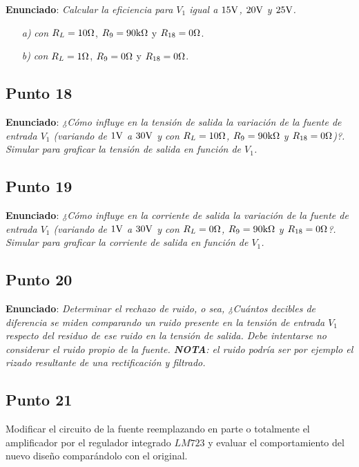 \textbf{Enunciado}: \textsl{Calcular la eficiencia para $V_{1}$ igual a $15 \si[per-mode=symbol]{\volt}$, $20 \si[per-mode=symbol]{\volt}$ y $25 \si[per-mode=symbol]{\volt}$.}

\begin{enumerate}
\item[\textsl{a)}] \textsl{con} $R_{L} = 10 \si[per-mode=symbol]{\ohm}$, $R_{9} = 90 \si[per-mode=symbol]{\kilo\ohm}$ y $R_{18} = 0 \si[per-mode=symbol]{\ohm}$.
\item[\textsl{b)}] \textsl{con} $R_{L} = 1 \si[per-mode=symbol]{\ohm}$, $R_{9} = 0 \si[per-mode=symbol]{\ohm}$ y $R_{18} = 0 \si[per-mode=symbol]{\ohm}$.
\end{enumerate}




\subsection{Punto 18}

\textbf{Enunciado}: \textsl{¿Cómo influye en la tensión de salida la variación de la fuente de entrada $V_{1}$ (variando de $1 \si[per-mode=symbol]{\volt}$ a $30 \si[per-mode=symbol]{\volt}$ y con $R_{L} = 10 \si[per-mode=symbol]{\ohm}$, $R_{9} = 90 \si[per-mode=symbol]{\kilo\ohm}$ y $R_{18} = 0 \si[per-mode=symbol]{\ohm}$)?. Simular para graficar la tensión de salida en función de $V_{1}$.}\\





\subsection{Punto 19}

\textbf{Enunciado}: \textsl{¿Cómo influye en la corriente de salida la variación de la fuente de entrada $V_{1}$ (variando de $1 \si[per-mode=symbol]{\volt}$ a $30 \si[per-mode=symbol]{\volt}$ y con $R_{L} = 0 \si[per-mode=symbol]{\ohm}$, $R_{9} = 90 \si[per-mode=symbol]{\kilo\ohm}$ y $R_{18} = 0 \si[per-mode=symbol]{\ohm}$?. Simular para graficar la corriente de salida en función de $V_{1}$.}\\




\subsection{Punto 20}

\textbf{Enunciado}: \textsl{Determinar el rechazo de ruido, o sea, ¿Cuántos decibles de diferencia se miden comparando un ruido presente en la tensión de entrada $V_{1}$ respecto del residuo de ese ruido en la tensión de salida. Debe intentarse no considerar el ruido propio de la fuente. \textbf{NOTA}: el ruido podría ser por ejemplo el rizado resultante de una rectificación y filtrado.}\\





\clearpage

\subsection{Punto 21}

Modificar el circuito de la fuente reemplazando en parte o totalmente el amplificador por el regulador integrado $LM723$ y evaluar el comportamiento del nuevo diseño comparándolo con el original.

\clearpage


